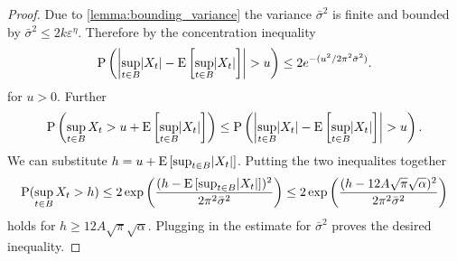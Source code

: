 \begin{proof}
Due to \cref{lemma:bounding_variance} the variance $\bar{\sigma}^2$ is finite and bounded by $\bar{\sigma}^2 \leq 2k \varepsilon^{\eta}$.
Therefore by the concentration inequality
\[
    \mathrm{P}\left( \left\lvert\sup_{t \in B} \lvert X_{t}\rvert - \operatorname*{E} \left[\sup_{t \in B} \lvert X_{t}\rvert\right]  \right\rvert > u \right)
    \leq 2 e^{-(u^2/2\pi^2\bar{\sigma}^2)}.
\]
for $u > 0$.
Further
\[
    \Prob\left( \sup_{t \in B} X_{t} > u + \E\left[ \sup_{t \in B} \lvert X_{t} \rvert \right] \right) \leq \Prob \left(  \left| \sup_{t \in B} \lvert X_{t} \rvert - \E \left[ \sup_{t \in B} \lvert  X_{t} \rvert \right] \right|> u \right).
\]
We can substitute $h = u + \operatorname*{E} \left[ \sup_{t \in B} \lvert  X_{t} \rvert \right] $.
Putting the two inequalites together
\[
    \mathrm{P}(\sup_{t \in B} X_{t} > h) \leq 2 \exp\left( \frac{(h-\operatorname*{E}\left[ \sup_{t \in B} \lvert X_{t} \rvert \right] )^2}{2 \pi^2 \bar{\sigma}^2} \right) \leq 2 \exp\left( \frac{(h-12 A \sqrt{\pi} \sqrt{\alpha})^2}{2\pi^2 \bar{\sigma}^2} \right)
\]
holds for $h \geq 12 A \sqrt{\pi} \sqrt{\alpha}$.
Plugging in the estimate for $\bar{\sigma}^2$ proves the desired inequality.
\end{proof}




